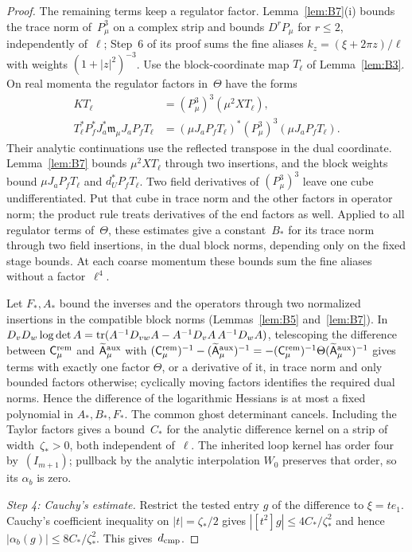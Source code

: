 \begin{proof}
The remaining terms keep a regulator factor. Lemma~\ref{lem:B7}(i) bounds the trace norm of~$P_\mu^3$ on a complex strip and bounds $D^rP_\mu$ for $r\le2$, independently of~$\ell$; Step~6 of its proof sums the fine aliases $k_z=(\xi+2\pi z)/\ell$ with weights $(1+|z|^2)^{-3}$. Use the block-coordinate map $T_\ell$ of Lemma~\ref{lem:B3}. On real momenta the regulator factors in~$\Theta$ have the forms
\begin{align*}
KT_\ell&=(P_\mu^3)^3(\mu^2XT_\ell),\\
T_\ell^*P_f^*J_a^*\mathfrak m_\mu J_aP_fT_\ell
&=(\mu J_aP_fT_\ell)^*(P_\mu^3)^3(\mu J_aP_fT_\ell).
\end{align*}
Their analytic continuations use the reflected transpose in the dual coordinate. Lemma~\ref{lem:B7} bounds $\mu^2XT_\ell$ through two insertions, and the block weights bound $\mu J_aP_fT_\ell$ and $d_U^*P_fT_\ell$. Two field derivatives of $(P_\mu^3)^3$ leave one cube undifferentiated. Put that cube in trace norm and the other factors in operator norm; the product rule treats derivatives of the end factors as well. Applied to all regulator terms of~$\Theta$, these estimates give a constant~$B_*$ for its trace norm through two field insertions, in the dual block norms, depending only on the fixed stage bounds. At each coarse momentum these bounds sum the fine aliases without a factor~$\ell^4$.

Let $F_*,A_*$ bound the inverses and the operators through two normalized insertions in the compatible block norms (Lemmas~\ref{lem:B5} and~\ref{lem:B7}). In $D_vD_w\log\det A=\operatorname{tr}(A^{-1}D_{vw}A-A^{-1}D_vA\,A^{-1}D_wA)$, telescoping the difference between $\mathsf C^{\rm rem}_\mu$ and $\widetilde{\mathsf A}^{\rm aux}_\mu$ with $(\mathsf C^{\rm rem}_\mu)^{-1}-(\widetilde{\mathsf A}^{\rm aux}_\mu)^{-1}=-(\mathsf C^{\rm rem}_\mu)^{-1}\Theta(\widetilde{\mathsf A}^{\rm aux}_\mu)^{-1}$ gives terms with exactly one factor $\Theta$, or a derivative of it, in trace norm and only bounded factors otherwise; cyclically moving factors identifies the required dual norms. Hence the difference of the logarithmic Hessians is at most a fixed polynomial in $A_*,B_*,F_*$. The common ghost determinant cancels. Including the Taylor factors gives a bound~$C_*$ for the analytic difference kernel on a strip of width~$\zeta_*>0$, both independent of~$\ell$. The inherited loop kernel has order four by~$(I_{m+1})$; pullback by the analytic interpolation $W_0$ preserves that order, so its $\alpha_b$ is zero.

\emph{Step 4: Cauchy's estimate.} Restrict the tested entry $g$ of the difference to $\xi=te_1$. Cauchy's coefficient inequality on $|t|=\zeta_*/2$ gives $|[t^2]g|\le4C_*/\zeta_*^2$ and hence $|\alpha_b(g)|\le8C_*/\zeta_*^2$. This gives~$d_{\rm cmp}$.
\end{proof}

